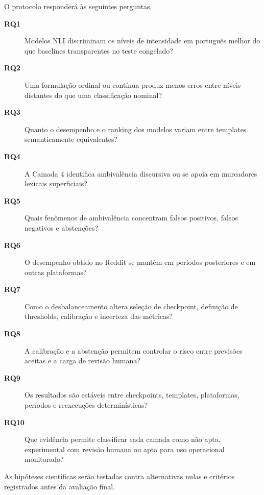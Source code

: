 O protocolo responderá às seguintes perguntas.

\begin{description}
\item[\textbf{RQ1}] Modelos NLI discriminam os níveis de intensidade em português melhor do que baselines transparentes no teste congelado?
\item[\textbf{RQ2}] Uma formulação ordinal ou contínua produz menos erros entre níveis distantes do que uma classificação nominal?
\item[\textbf{RQ3}] Quanto o desempenho e o ranking dos modelos variam entre templates semanticamente equivalentes?
\item[\textbf{RQ4}] A Camada 4 identifica ambivalência discursiva ou se apoia em marcadores lexicais superficiais?
\item[\textbf{RQ5}] Quais fenômenos de ambivalência concentram falsos positivos, falsos negativos e abstenções?
\item[\textbf{RQ6}] O desempenho obtido no Reddit se mantém em períodos posteriores e em outras plataformas?
\item[\textbf{RQ7}] Como o desbalanceamento altera seleção de checkpoint, definição de thresholds, calibração e incerteza das métricas?
\item[\textbf{RQ8}] A calibração e a abstenção permitem controlar o risco entre previsões aceitas e a carga de revisão humana?
\item[\textbf{RQ9}] Os resultados são estáveis entre checkpoints, templates, plataformas, períodos e reexecuções determinísticas?
\item[\textbf{RQ10}] Que evidência permite classificar cada camada como não apta, experimental com revisão humana ou apta para uso operacional monitorado?
\end{description}

As hipóteses científicas serão testadas contra alternativas nulas e critérios registrados antes da avaliação final.

